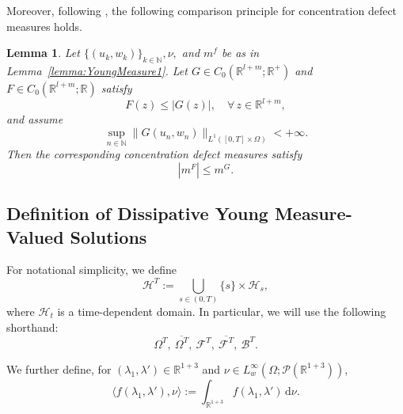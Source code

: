 \documentclass[11pt,twoside,reqno]{amsart}
\numberwithin{equation}{section}
\numberwithin{figure}{section}
\newtheorem{lemma}{Lemma}[section]
\begin{document}
Moreover, following \cite[Lemma 2.1]{MR3567640}, the following comparison principle for concentration defect measures holds.

\begin{lemma}\label{lemma:comparison}
Let $\{(u_k,w_k)\}_{k\in \mathbb{N}}, \nu,$ and $m^f$ be as in Lemma~\ref{lemma:YoungMeasure1}. 
Let $G \in C_0(\mathbb{R}^{l+m}; \mathbb{R}^+)$ and $F \in C_0(\mathbb{R}^{l+m}; \mathbb{R})$ satisfy
\[
F(z) \le |G(z)|, \quad \forall\, z \in \mathbb{R}^{l+m},
\]
and assume
\[
\sup_{n\in \mathbb{N}} \| G(u_n, w_n) \|_{L^1([0,T]\times\Omega)} < +\infty.
\]
Then the corresponding concentration defect measures satisfy
\begin{equation}
    |m^F| \le m^G.
\end{equation}
\end{lemma}



\subsection{Definition of Dissipative Young Measure-Valued Solutions}

For notational simplicity, we define
\[
\mathcal{H}^T := \bigcup_{s\in(0,T)} \{s\}\times\mathcal{H}_s,
\]
where $\mathcal{H}_t$ is a time-dependent domain. In particular, we will use the following shorthand:
\[
\Omega^T, \ \overline{\Omega^T}, \ \mathcal{F}^T, \ \overline{\mathcal{F}^T}, \ \mathcal{B}^T.
\]

We further define, for $(\lambda_1, \lambda') \in \mathbb{R}^{1+3}$ and $\nu \in L^{\infty}_w(\Omega; \mathcal{P}(\mathbb{R}^{1+3}))$,
\[
\langle f(\lambda_1, \lambda'), \nu \rangle := \int_{\mathbb{R}^{1+3}} f(\lambda_1, \lambda') \, \mathrm{d}\nu.
\]
\end{document}

